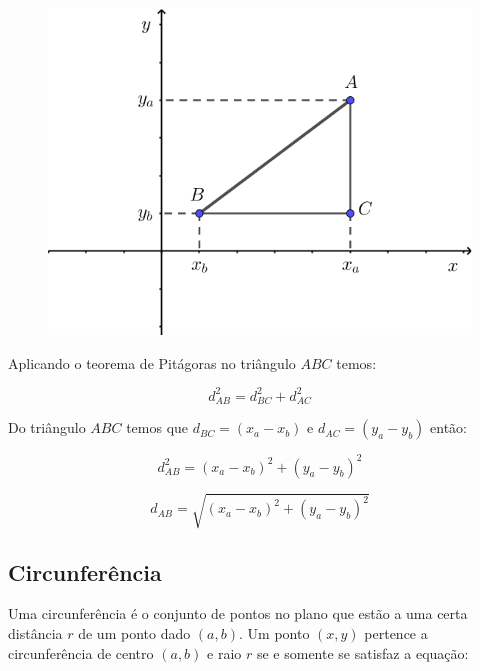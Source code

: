 \begin{figure}[H]
	\centering
	
	\includegraphics[scale=3.5]{imagens/distanciad.png}

\end{figure}
\begin{center}
Aplicando o teorema de Pitágoras no triângulo $ABC$ temos:
\end{center}


$$d_{AB}^2 = d_{BC}^2 + d_{AC}^2$$
\begin{center}
Do triângulo $ABC$ temos  que $d_{BC} = (x_a - x_b)$ e $d_{AC} = (y_a - y_b)$ então:
\end{center}

$$d_{AB}^2 ={(x_a - x_b)}^2 + {(y_a - y_b)}^2   $$

$$d_{AB} = \sqrt{{(x_a - x_b)}^2 + {(y_a - y_b)}^2}$$


\subsection{Circunferência}

Uma circunferência é o conjunto de pontos no plano que estão a uma certa distância $r$ de um ponto dado $( a, b )$.
Um ponto $( x, y )$ pertence a circunferência
de centro $( a, b )$ e raio $r$ se e somente se satisfaz a equação:

